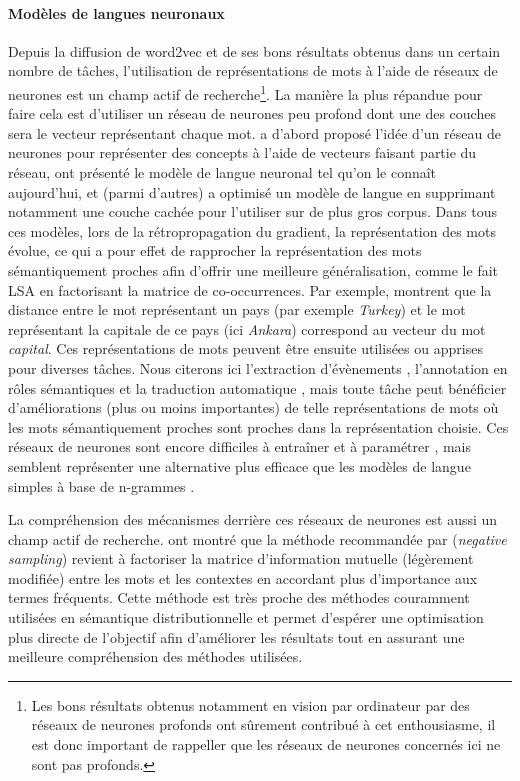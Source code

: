 \paragraph{Modèles de langues neuronaux} Depuis la diffusion de word2vec
\citep{mikolov2013distributed} et de ses bons résultats obtenus dans un certain
nombre de tâches, l'utilisation de représentations de mots à l'aide de réseaux
de neurones est un champ actif de recherche\footnote{Les bons résultats obtenus
notamment en vision par ordinateur par des réseaux de neurones profonds ont
sûrement contribué à cet enthousiasme, il est donc important de rappeller que
les réseaux de neurones concernés ici ne sont pas profonds.}.  La manière la
plus répandue pour faire cela est d'utiliser un réseau de neurones peu profond
dont une des couches sera le vecteur représentant chaque mot.
\cite{hinton1986learning} a d'abord proposé l'idée d'un réseau de neurones pour
représenter des concepts à l'aide de vecteurs faisant partie du réseau,
\cite{bengio2001neural,bengio2003neural} ont présenté le modèle de langue
neuronal tel qu'on le connaît aujourd'hui, et \cite{mikolov2013distributed}
(parmi d'autres) a optimisé un modèle de langue en supprimant notamment une
couche cachée pour l'utiliser sur de plus gros corpus. Dans tous ces modèles,
lors de la rétropropagation du gradient, la représentation des mots évolue, ce
qui a pour effet de rapprocher la représentation des mots sémantiquement
proches afin d'offrir une meilleure généralisation, comme le fait LSA en
factorisant la matrice de co-occurrences.  Par exemple,
\cite{mikolov2013distributed} montrent que la distance entre le mot
représentant un pays (par exemple \textit{Turkey}) et le mot représentant la
capitale de ce pays (ici \textit{Ankara}) correspond au vecteur du mot
\textit{capital}.  Ces représentations de mots peuvent être ensuite utilisées ou
apprises pour diverses tâches. Nous citerons ici l'extraction d'évènements
\citep{boros2014etiquetage}, l'annotation en rôles sémantiques
\citep{lechelle2014utilisation} et la traduction automatique
\citep{devlin2014fast}, mais toute tâche peut bénéficier d'améliorations (plus
ou moins importantes) de telle représentations de mots où les mots
sémantiquement proches sont proches dans la représentation choisie.  Ces
réseaux de neurones sont encore difficiles à entraîner et à paramétrer
\citep{do2014modeles}, mais semblent représenter une alternative plus efficace
que les modèles de langue simples à base de n-grammes \citep{baroni2014dont}.

La compréhension des mécanismes derrière ces réseaux de neurones est aussi un
champ actif de recherche. \cite{levy2014neural} ont montré que la méthode
recommandée par \cite{mikolov2013distributed} (\textit{negative sampling})
revient à factoriser la matrice d'information mutuelle (légèrement modifiée)
entre les mots et les contextes en accordant plus d'importance aux termes
fréquents. Cette méthode est très proche des méthodes couramment utilisées en
sémantique distributionnelle et permet d'espérer une optimisation plus directe
de l'objectif afin d'améliorer les résultats tout en assurant une meilleure
compréhension des méthodes utilisées.

